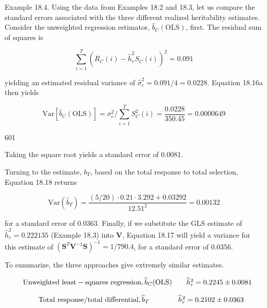 \documentclass{article}
\begin{document}
Example 18.4. Using the data from Examples 18.2 and 18.3, let us compare the standard errors associated with the three different realized heritability estimates. Consider the unweighted regression estimator,  $ \widehat{b}_{C}(\mathrm{OLS}) $, first. The residual sum of squares is

\begin{equation}
\sum_{i=1}^{T}\left(R_{C}(i)-\widehat{h}_{r}^{2}S_{C}(i)\right)^{2}=0.091
\end{equation}

yielding an estimated residual variance of  $ \widehat{\sigma}_{e}^{2}=0.091/4=0.0228 $. Equation 18.16a then yields

\begin{equation}
\mathrm{Var}\left[\widehat{b}_{C}(\mathrm{OLS})\right]=\sigma_{e}^{2}\bigg/\sum_{i=1}^{T}S_{C}^{2}(i)=\frac{0.0228}{350.45}=0.0000649
\end{equation}

601

Taking the square root yields a standard error of 0.0081.

Turning to the estimate,  $ b_{T} $, based on the total response to total selection, Equation 18.18 returns

\begin{equation}
\mathrm{Var}(\widehat{b}_{T})=\frac{(5/20)\cdot0.21\cdot3.292+0.03292}{12.51^{2}}=0.00132
\end{equation}

for a standard error of 0.0363. Finally, if we substitute the GLS estimate of  $ \widehat{h}_r^2 = 0.222135 $ (Example 18.3) into  $ \mathbf{V} $, Equation 18.17 will yield a variance for this estimate of  $ (\mathbf{S}^T \mathbf{V}^{-1} \mathbf{S})^{-1} = 1/790.4 $, for a standard error of 0.0356.

To summarize, the three approaches give extremely similar estimates.

\begin{equation}
\begin{array}{r l r l}&{\mathrm{U n w e i g h t e d~l e a s t-s q u a r e s~r e g r e s s i o n},\widehat{b}_{C}(\mathrm{O L S})}&{}&{\widehat{h}_{r}^{2}=0.2245\pm0.0081}\end{array}
\end{equation}

\begin{equation}
\begin{array}{r l r l r l r}&{}&{\mathrm{T o t a l~r e s p o n s e/t o t a l~d i f f e r e n t i a l},\widehat{b}_{T}}&&{\quad}&{\widehat{h}_{r}^{2}=0.2102\pm0.0363}\end{array}
\end{equation}
\end{document}
